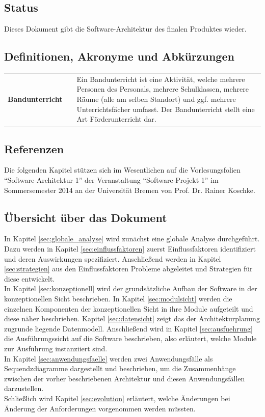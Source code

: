 \documentclass[fontsize=12pt,paper=a4,twoside]{scrartcl}
\renewcommand{\arraystretch}{1.2}
\begin{document}
\subsection{Status}
Dieses Dokument gibt die Software-Architektur des finalen Produktes wieder.


  
\subsection{Definitionen, Akronyme und Abkürzungen}

\renewcommand{\arraystretch}{2}
\begin{tabularx}{\textwidth}{Xp{1cm}p{9.5cm}}
\textbf{Bandunterricht} 	&  	& 	Ein Bandunterricht ist eine Aktivität, welche mehrere Personen des Personals, mehrere Schulklassen, mehrere Räume (alle am selben Standort) und ggf. mehrere Unterrichtsfächer umfasst. Der Bandunterricht stellt eine Art Förderunterricht dar. \\ 
\end{tabularx} 
\renewcommand{\arraystretch}{1.4}

\subsection{Referenzen}
Die folgenden Kapitel stützen sich im Wesentlichen auf die Vorlesungsfolien "`Software-Architektur 1"' der Veranstaltung "`Software-Projekt 1"' im Sommersemester 2014 an der Universität Bremen von Prof. Dr. Rainer Koschke.


\subsection{Übersicht über das Dokument}
In Kapitel \ref{sec:globale_analyse} wird zunächst eine globale Analyse durchgeführt. Dazu werden in Kapitel \ref{sec:einflussfaktoren} zuerst Einflussfaktoren identifiziert und deren Auswirkungen spezifiziert. Anschließend werden in Kapitel \ref{sec:strategien} aus den Einflussfaktoren Probleme abgeleitet und Strategien für diese entwickelt. \\
In Kapitel \ref{sec:konzeptionell} wird der grundsätzliche Aufbau der Software in der konzeptionellen Sicht beschrieben. In Kapitel \ref{sec:modulsicht} werden die einzelnen Komponenten der konzeptionellen Sicht in ihre Module aufgeteilt und diese näher beschrieben. Kapitel \ref{sec:datensicht} zeigt das der Architekturplanung zugrunde liegende Datenmodell. Anschließend wird in Kapitel \ref{sec:ausfuehrung} die Ausführungssicht auf die Software beschrieben, also erläutert, welche Module zur Ausführung instanziiert sind. 
\\
In Kapitel \ref{sec:anwendungsfaelle} werden zwei Anwendungsfälle als Sequendzdiagramme dargestellt und beschrieben, um die Zusammenhänge zwischen der vorher beschriebenen Architektur und diesen Anwendungsfällen darzustellen.\\
Schließlich wird Kapitel \ref{sec:evolution} erläutert, welche Änderungen bei Änderung der Anforderungen vorgenommen werden müssten.
\end{document}
